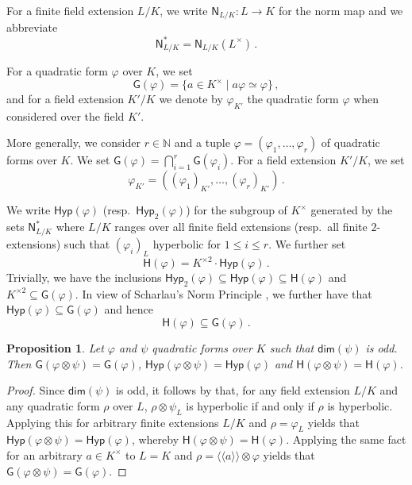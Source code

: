 \documentclass[twoside,11pt]{amsart}
\numberwithin{equation}{section}
\newtheorem{prop}[equation]{Proposition}
\theoremstyle{definition}
\renewcommand{\dim}{\operatorname{\mathsf{dim}}}
\newcommand\N{\operatorname{N}}
\newcommand{\vf}{\varphi}
\newcommand{\mg}[1]{{#1}^{\times}}
\newcommand{\sq}[1]{{#1}^{\times 2}}
\newcommand{\nat}{\mathbb{N}}
\newcommand{\la}{\langle}
\newcommand{\ra}{\rangle}
\newcommand{\lla}{\la\!\la}
\newcommand{\rra}{\ra\!\ra}
\newcommand{\an}{\mathsf{an}}
\renewcommand{\leq}{\leqslant}
\renewcommand{\N}{\mathsf{N}}
\newcommand{\G}{\mathsf{G}}
\renewcommand{\H}{\mathsf{H}}
\newcommand{\Hyp}{\mathsf{Hyp}}
\renewcommand{\dim}{\mathsf{dim}}
\renewcommand{\leq}{\leqslant}
\begin{document}
For a finite field extension $L/K$, we write 
$\N_{L/K}:L\to K$ for the norm map and we abbreviate $$\N_{L/K}^\ast=\N_{L/K}(\mg{L})\,.$$

For a quadratic form $\varphi$ over $K$, we set
$$\G(\vf)=\{a\in\mg{K}\mid a\vf\simeq \vf\}\,,$$
and for a field extension $K'/K$ we denote by $\varphi_{K'}$ the quadratic form $\varphi$ when considered over the field $K'$.

More generally, we consider $r\in\nat$ and a tuple $\varphi=(\varphi_1,\dots,\varphi_r)$ of quadratic forms over $K$.
We set $\G(\varphi)=\bigcap_{i=1}^r\G(\varphi_i)$.
For a field extension $K'/K$, we set $$\varphi_{K'}=((\varphi_1)_{K'},\dots,(\varphi_r)_{K'})\,.$$

We write $\Hyp(\vf)$ (resp.~$\Hyp_2(\vf)$) for the subgroup of $\mg{K}$ generated by the sets $\N_{L/K}^\ast$ where $L/K$ ranges over all finite field extensions (resp.~all finite $2$-extensions) such that $(\varphi_i)_L$ hyperbolic for $1\leq i\leq r$.
We further set 
$$\H(\vf)=\sq{K}\cdot\Hyp(\vf)\,.$$
Trivially, we have the inclusions $\Hyp_2(\vf)\subseteq\Hyp(\vf)\subseteq\H(\vf)$ and $\sq{K}\subseteq\G(\vf)$.
In view of Scharlau's Norm Principle \cite[Chap.~VII, Sect.~4]{Lam05}, we further have  that $\Hyp(\vf)\subseteq \G(\vf)$ and hence $$\H(\vf)\subseteq \G(\vf)\,.$$

\begin{prop}\label{no-odd-zero-divisors}
Let $\varphi$ and $\psi$ quadratic forms over $K$ such that $\dim(\psi)$ is odd.
Then $\G(\vf\otimes\psi)=\G(\vf)$, $\Hyp(\vf\otimes\psi)=\Hyp(\vf)$ and $\H(\vf\otimes\psi)=\H(\vf)$.
\end{prop}
\begin{proof}
Since $\dim(\psi)$ is odd, it follows by \cite[Chap.~VIII, Cor.~8.5]{Lam05} that,
for any field extension $L/K$ and any quadratic form $\rho$ over $L$,
$\rho\otimes \psi_L$ is hyperbolic if and only if $\rho$ is hyperbolic.
Applying this for arbitrary finite extensions $L/K$ and $\rho=\vf_L$ yields that $\Hyp(\vf\otimes\psi)=\Hyp(\vf)$, whereby $\H(\vf\otimes\psi)=\H(\vf)$.
Applying the same fact for an arbitrary $a\in\mg{K}$ to $L=K$ and $\rho=\lla a\rra\otimes\vf$ yields that $\G(\vf\otimes\psi)=\G(\vf)$.
\end{proof}
\end{document}

